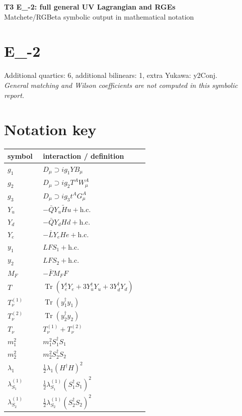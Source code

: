 \documentclass[10pt,a4paper]{article}
\begin{document}
\begin{center}
{\Large\bfseries T3 E\_-2: full general UV Lagrangian and RGEs}\\[4pt]
Matchete/RGBeta symbolic output in mathematical notation
\end{center}
\bigskip
\section*{E\_-2}
Additional quartics: 6, additional bilinears: 1, extra Yukawa: y2Conj.\\
\emph{General matching and Wilson coefficients are not computed in this symbolic report.}
\section*{Notation key}
\begin{longtable}{@{}p{0.23\linewidth}p{0.69\linewidth}@{}}
\toprule
symbol & interaction / definition \\
\midrule
$g_1$ & $D_\mu\supset i g_1YB_\mu$ \\
$g_2$ & $D_\mu\supset i g_2T^AW_\mu^A$ \\
$g_3$ & $D_\mu\supset i g_3t^AG_\mu^A$ \\
$Y_u$ & $-\bar QY_u\widetilde Hu+\mathrm{h.c.}$ \\
$Y_d$ & $-\bar QY_dHd+\mathrm{h.c.}$ \\
$Y_e$ & $-\bar LY_eHe+\mathrm{h.c.}$ \\
$y_1$ & $LFS_1+\mathrm{h.c.}$ \\
$y_2$ & $LFS_2+\mathrm{h.c.}$ \\
$M_F$ & $-\bar FM_FF$ \\
$T$ & $\operatorname{Tr}(Y_e^\dagger Y_e+3Y_u^\dagger Y_u+3Y_d^\dagger Y_d)$ \\
$T_\nu^{(1)}$ & $\operatorname{Tr}(y_1^\dagger y_1)$ \\
$T_\nu^{(2)}$ & $\operatorname{Tr}(y_2^\dagger y_2)$ \\
$T_\nu$ & $T_\nu^{(1)}+T_\nu^{(2)}$ \\
$m_1^2$ & $m_1^2S_1^\dagger S_1$ \\
$m_2^2$ & $m_2^2S_2^\dagger S_2$ \\
$\lambda_1$ & $\frac12\lambda_1(H^\dagger H)^2$ \\
$\lambda_{S_1}^{(1)}$ & $\frac12\lambda_{S_1}^{(1)}(S_1^\dagger S_1)^2$ \\
$\lambda_{S_2}^{(1)}$ & $\frac12\lambda_{S_2}^{(1)}(S_2^\dagger S_2)^2$ \\

\end{longtable}
\end{document}

